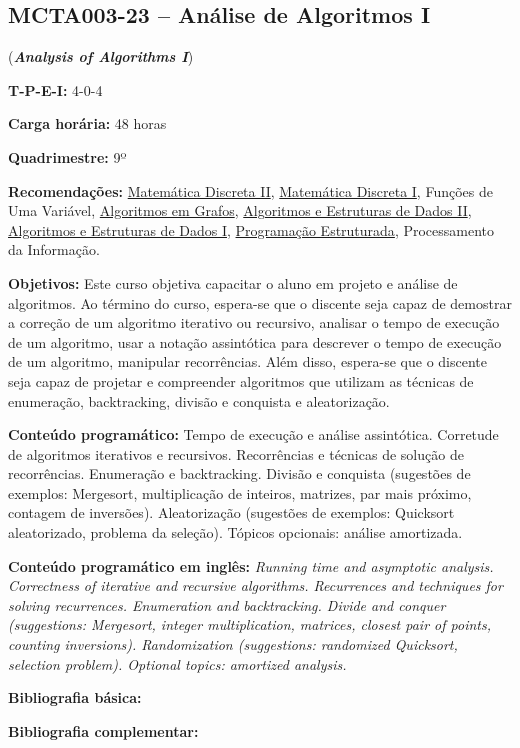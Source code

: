 \documentclass[class=article, crop=false]{standalone}
\begin{document}
\subsection{MCTA003-23 -- Análise de Algoritmos I}
\label{disc:aaI}

(\textbf{\textit{Analysis of Algorithms I}})

\begin{center}
    \begin{minipage}{0.85\textwidth}
        \textbf{T-P-E-I:} 4-0-4
        
        \textbf{Carga horária:} 48 horas
        
        \textbf{Quadrimestre:} 9º
        
        \textbf{Recomendações:} 
        \hyperref[disc:mdII]{Matemática Discreta II},
        \hyperref[disc:mdI]{Matemática Discreta I},
        Funções de Uma Variável,
        \hyperref[disc:ag]{Algoritmos em Grafos},
        \hyperref[disc:aedII]{Algoritmos e Estruturas de Dados II},
        \hyperref[disc:aedI]{Algoritmos e Estruturas de Dados I},
        \hyperref[disc:pe]{Programação Estruturada},
        Processamento da Informação.
    \end{minipage}
\end{center}

\textbf{Objetivos:}
Este curso objetiva capacitar o aluno em projeto e análise de algoritmos. 
Ao término do curso, espera-se que o discente seja capaz de demostrar a
correção de um algoritmo iterativo ou recursivo, analisar o tempo de execução
de um algoritmo, usar a notação assintótica para descrever o tempo de execução
de um algoritmo, manipular recorrências.
Além disso, espera-se que o discente seja capaz de projetar e compreender
algoritmos que utilizam as técnicas de enumeração, backtracking, divisão e
conquista e aleatorização.


\textbf{Conteúdo programático:}
Tempo de execução e análise assintótica.
Corretude de algoritmos iterativos e recursivos.
Recorrências e técnicas de solução de recorrências.
Enumeração e backtracking.
Divisão e conquista (sugestões de exemplos: Mergesort, multiplicação de
inteiros, matrizes, par mais próximo, contagem de inversões).
Aleatorização (sugestões de exemplos: Quicksort aleatorizado, problema da seleção). 
Tópicos opcionais: análise amortizada.

\textbf{Conteúdo programático em inglês:}
\textit{Running time and asymptotic analysis.
Correctness of iterative and recursive algorithms.
Recurrences and techniques for solving recurrences.
Enumeration and backtracking.
Divide and conquer (suggestions: Mergesort, integer multiplication, matrices, closest pair of points, counting inversions).
Randomization (suggestions: randomized Quicksort, selection problem).
Optional topics: amortized analysis.}

\newrefsection
\textbf{Bibliografia básica:}
\nocite{2012-cormen-etal, 2008-dasgupta-etal, 1998-sedgewick}
\printbibliography

\newrefsection
\textbf{Bibliografia complementar:}
\nocite{2011-sedgewick-wayne, 2006-kleinberg-tardos, 1989-manber}
\printbibliography
\end{document}
